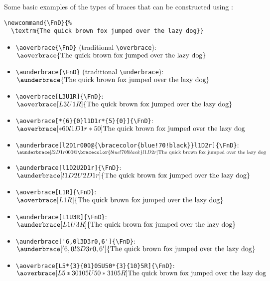 \documentclass[10pt]{ltxdockit}[2011/03/25]
\begin{document}
Some basic examples of the types of braces that can be constructed using :
\begin{lstlisting}
\newcommand{\FnD}{%
  \textrm{The quick brown fox jumped over the lazy dog}}
\end{lstlisting}

\newcommand{\FnD}{%
  \textrm{The quick brown fox jumped over the lazy dog}}
\begin{itemize}
  \item \lstinline!\aoverbrace{\FnD}! (traditional \lstinline!\overbrace!): \\
    $\aoverbrace{\FnD}$
    
  \item \lstinline!\aunderbrace{\FnD}! (traditional \lstinline!\underbrace!): \\
    $\aunderbrace{\FnD}$
    
  \item \lstinline!\aoverbrace[L3U1R]{\FnD}!: \\
    $\aoverbrace[L3U1R]{\FnD}$
    
  \item \lstinline!\aoverbrace[*{6}{0}l1D1r*{5}{0}]{\FnD}!: \\
    $\aoverbrace[*{6}{0}l1D1r*{5}{0}]{\FnD}$
    
  \item \lstinline~\aunderbrace[l2D1r000@{\bracecolor{blue!70!black}}l1D2r]{\FnD}~: \\
    $\aunderbrace[l2D1r000@{\bracecolor{blue!70!black}}l1D2r]{\FnD}$
    
  \item \lstinline!\aunderbrace[l1D2U2D1r]{\FnD}!: \\
    $\aunderbrace[l1D2U2D1r]{\FnD}$
    
  \item \lstinline!\aoverbrace[L1R]{\FnD}!: \\
    $\aoverbrace[L1R]{\FnD}$
    
  \item \lstinline!\aunderbrace[L1U3R]{\FnD}!: \\
    $\aunderbrace[L1U3R]{\FnD}$
    
  \item \lstinline!\aunderbrace['6,0l3D3r0,6']{\FnD}!: \\
    $\aunderbrace['6,0l3D3r0,6']{\FnD}$
    
  \item \lstinline!\aoverbrace[L5*{3}{01}05U50*{3}{10}5R]{\FnD}!: \\
    $\aoverbrace[L5*{3}{01}05U50*{3}{10}5R]{\FnD}$
    

\end{itemize}
\end{document}
